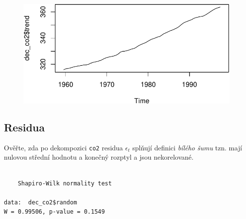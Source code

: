 \documentclass[
  letterpaper,
  DIV=11,
  numbers=noendperiod]{scrreprt}
\newenvironment{Shaded}{\begin{snugshade}}{\end{snugshade}}
\newcommand{\AttributeTok}[1]{\textcolor[rgb]{0.40,0.45,0.13}{#1}}
\newcommand{\ConstantTok}[1]{\textcolor[rgb]{0.56,0.35,0.01}{#1}}
\newcommand{\FunctionTok}[1]{\textcolor[rgb]{0.28,0.35,0.67}{#1}}
\newcommand{\NormalTok}[1]{\textcolor[rgb]{0.00,0.23,0.31}{#1}}
\newcommand{\SpecialCharTok}[1]{\textcolor[rgb]{0.37,0.37,0.37}{#1}}
\begin{document}
\begin{Shaded}
\end{Shaded}

\begin{figure}[H]

{\centering \includegraphics{09_casove_rady_files/figure-pdf/unnamed-chunk-3-2.pdf}

}

\end{figure}

\hypertarget{residua}{%
\subsection{Residua}\label{residua}}

Ověřte, zda po dekompozici \texttt{co2} residua \(\epsilon_t\) splňují
definici \emph{bílého šumu} tzn. mají nulovou střední hodnotu a konečný
rozptyl a jsou nekorelované.

\begin{Shaded}
\end{Shaded}

\begin{verbatim}

    Shapiro-Wilk normality test

data:  dec_co2$random
W = 0.99506, p-value = 0.1549
\end{verbatim}

\begin{Shaded}
\end{Shaded}
\end{document}

